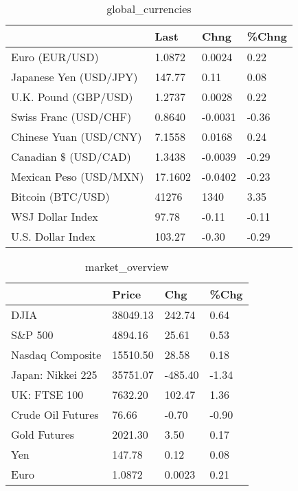 \documentclass{article}%
\begin{document}
%


\begin{table}[htbp]%
\caption{global\_currencies}%
\centering%
\begin{adjustbox}{width=1\textwidth}%
\begin{tabular}{llll}
\toprule
                       &    Last &    Chng & \%Chng \\
\midrule
        Euro (EUR/USD) &  1.0872 &  0.0024 &  0.22 \\
Japanese Yen (USD/JPY) &  147.77 &    0.11 &  0.08 \\
  U.K. Pound (GBP/USD) &  1.2737 &  0.0028 &  0.22 \\
 Swiss Franc (USD/CHF) &  0.8640 & -0.0031 & -0.36 \\
Chinese Yuan (USD/CNY) &  7.1558 &  0.0168 &  0.24 \\
  Canadian \$ (USD/CAD) &  1.3438 & -0.0039 & -0.29 \\
Mexican Peso (USD/MXN) & 17.1602 & -0.0402 & -0.23 \\
     Bitcoin (BTC/USD) &   41276 &    1340 &  3.35 \\
      WSJ Dollar Index &   97.78 &   -0.11 & -0.11 \\
     U.S. Dollar Index &  103.27 &   -0.30 & -0.29 \\
\bottomrule
\end{tabular}
%
\end{adjustbox}%
\end{table}

%


\begin{table}[htbp]%
\caption{market\_overview}%
\centering%
\begin{adjustbox}{width=1\textwidth}%
\begin{tabular}{llll}
\toprule
                  &    Price &     Chg &  \%Chg \\
\midrule
             DJIA & 38049.13 &  242.74 &  0.64 \\
          S\&P 500 &  4894.16 &   25.61 &  0.53 \\
 Nasdaq Composite & 15510.50 &   28.58 &  0.18 \\
Japan: Nikkei 225 & 35751.07 & -485.40 & -1.34 \\
     UK: FTSE 100 &  7632.20 &  102.47 &  1.36 \\
Crude Oil Futures &    76.66 &   -0.70 & -0.90 \\
     Gold Futures &  2021.30 &    3.50 &  0.17 \\
              Yen &   147.78 &    0.12 &  0.08 \\
             Euro &   1.0872 &  0.0023 &  0.21 \\
\bottomrule
\end{tabular}
%
\end{adjustbox}%
\end{table}

%
\end{document}
